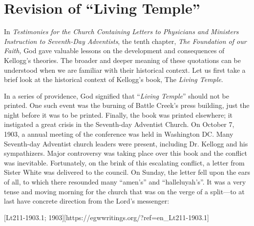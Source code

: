 \chapter{Revision of “Living Temple”}

In \textit{Testimonies for the Church Containing Letters to Physicians and Ministers Instruction to Seventh-Day Adventists}, the tenth chapter, \textit{The Foundation of our Faith,} God gave valuable lessons on the development and consequences of Kellogg's theories. The broader and deeper meaning of these quotations can be understood when we are familiar with their historical context. Let us first take a brief look at the historical context of Kellogg's book, The \textit{Living Temple}.

In a series of providence, God signified that “\textit{Living Temple}” should not be printed. One such event was the burning of Battle Creek's press building, just the night before it was to be printed. Finally, the book was printed elsewhere; it instigated a great crisis in the Seventh-day Adventist Church. On October 7, 1903, a annual meeting of the conference was held in Washington DC. Many Seventh-day Adventist church leaders were present, including Dr. Kellogg and his sympathizers. Major controversy was taking place over this book and the conflict was inevitable. Fortunately, on the brink of this escalating conflict, a letter from Sister White was delivered to the council. On Sunday, the letter fell upon the ears of all, to which there resounded many “amen's” and “halleluyah's”. It was a very tense and moving morning for the church that was on the verge of a split—to at last have concrete direction from the Lord's messenger:

[Lt211-1903.1; 1903][https://egwwritings.org/?ref=en\_Lt211-1903.1]

